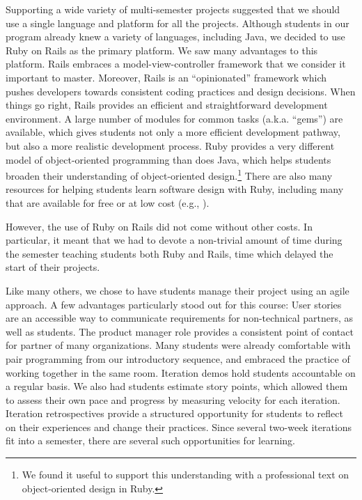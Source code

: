 
Supporting a wide variety of multi-semester projects suggested that
we should use a single language and platform for all the
projects.
Although students in our program already knew
a variety of languages, including Java, we decided to use Ruby on
Rails as the primary platform.  We saw many advantages to this
platform. Rails embraces a model-view-controller framework that we
consider it important to master. Moreover, Rails is an ``opinionated'' framework
which pushes developers towards consistent coding practices and
design decisions.  When things go right, Rails provides an efficient
and straightforward development environment.  A large number of
modules for common tasks (a.k.a. ``gems'') are available, which
gives students not only a more efficient development pathway, but
also a more realistic development process. Ruby provides a very
different model of object-oriented programming than does Java, which
helps students broaden their understanding of object-oriented
design.\footnote{We found it useful to support this understanding
with a professional text on object-oriented design in Ruby.\cite{poodr}}
There are also many resources for helping students
learn software design with Ruby, including many that are available
for free or at low cost (e.g., \cite{saasbook,rails-tutorial}).

However, the use of Ruby on Rails did not come without other costs.  In
particular, it meant that we had to devote a non-trivial amount of
time during the semester teaching students both Ruby and Rails, time
which delayed the start of their projects.

Like many others, we chose to have students manage their project using an 
agile approach.  A few advantages particularly stood out
for this course: User stories are an accessible way to communicate
requirements for non-technical partners, as well as students. 
The product manager role provides a consistent point of contact for partner 
of many organizations.
Many students were already comfortable with pair programming from our 
introductory sequence, and embraced the 
practice of working together in the same room.
Iteration demos hold students accountable on a regular basis.  
We also had students estimate story points, which allowed them to assess 
their own pace and progress by measuring velocity for each iteration.
Iteration retrospectives provide a structured opportunity for students 
to reflect on their experiences and change their practices.  
Since several two-week iterations fit into a 
semester, there are several such opportunities for learning.

